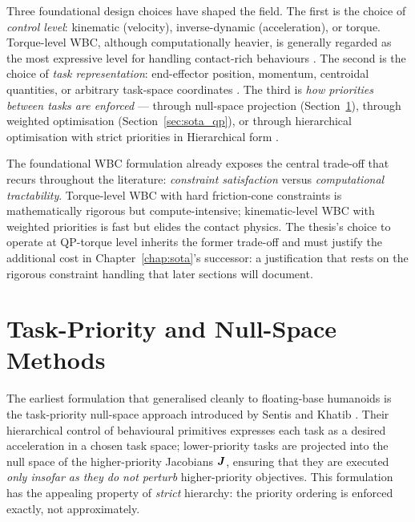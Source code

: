Three foundational design choices have shaped the field. The first is
the choice of \emph{control level}: kinematic (velocity),
inverse-dynamic (acceleration), or torque. Torque-level WBC, although
computationally heavier, is generally regarded as the most expressive
level for handling contact-rich behaviours \cite{Wensing2013}. The
second is the choice of \emph{task representation}: end-effector
position, momentum, centroidal quantities, or arbitrary task-space
coordinates \cite{Koolen2016}. The third is \emph{how priorities
between tasks are enforced} --- through null-space projection
(Section~\ref{sec:sota_nullspace}), through weighted optimisation
(Section~\ref{sec:sota_qp}), or through hierarchical optimisation with
strict priorities in Hierarchical \QP{} form
\cite{Sentis2005,Wensing2013,Koolen2016,EscandeMansard2014}.

\begin{criticalinsight}
The foundational WBC formulation already exposes the central trade-off
that recurs throughout the literature: \emph{constraint satisfaction}
versus \emph{computational tractability}. Torque-level WBC with hard
friction-cone constraints is mathematically rigorous but compute-intensive;
kinematic-level WBC with weighted priorities is fast but elides the
contact physics. The thesis's choice to operate at QP-torque level inherits
the former trade-off and must justify the additional cost in
Chapter~\ref{chap:sota}'s successor: a justification that rests on the
rigorous constraint handling that later sections will document.
\end{criticalinsight}


\section{Task-Priority and Null-Space Methods}
\label{sec:sota_nullspace}

The earliest \WBC{} formulation that generalised cleanly to floating-base
humanoids is the task-priority null-space approach introduced by
Sentis and Khatib \cite{Sentis2005}. Their hierarchical control of
behavioural primitives expresses each task as a desired acceleration in
a chosen task space; lower-priority tasks are projected into the null
space of the higher-priority Jacobians $\bm{J}$, ensuring that they are
executed \emph{only insofar as they do not perturb} higher-priority
objectives. This formulation has the appealing property of \emph{strict}
hierarchy: the priority ordering is enforced exactly, not approximately.

